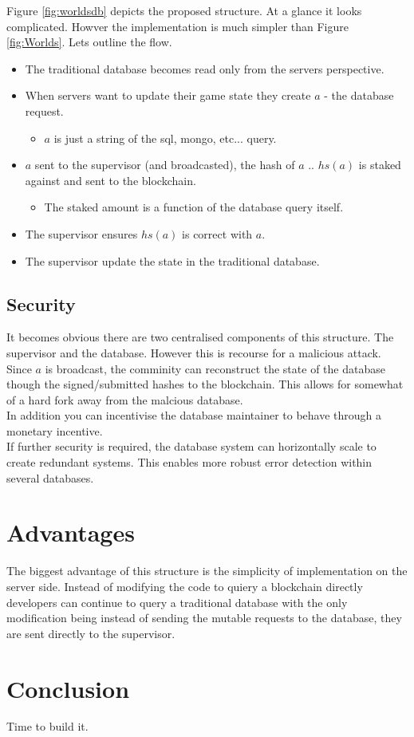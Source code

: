 \documentclass[runningheads,a4paper]{llncs}
\begin{document}
Figure \ref{fig:worldsdb} depicts the proposed structure. At a glance it looks
complicated. Howver the implementation is much simpler than Figure
\ref{fig:Worlds}. Lets outline the flow.

\begin{itemize}
\item The traditional database becomes read only from the servers perspective.
\item When servers want to update their game state they create $a$ - the database request.
\begin{itemize}
\item $a$ is just a string of the sql, mongo, etc... query.
\end{itemize}
\item $a$ sent to the supervisor (and broadcasted), the hash of $a$ .. $hs(a)$ is staked against and sent to the blockchain.
\begin{itemize}
\item The staked amount is a function of the database query itself.
\end{itemize}
\item The supervisor ensures $hs(a)$ is correct with $a$.
\item The supervisor update the state in the traditional database.
\end{itemize}

\subsection{Security}
It becomes obvious there are two centralised components of this structure. The
supervisor and the database. However this is recourse for a malicious attack. 
Since $a$ is broadcast, the comminity can reconstruct the state of the database though the
signed/submitted hashes to the blockchain. This allows for somewhat of a hard
fork away from the malcious database. 
\\

In addition you can incentivise the database maintainer to behave through a
monetary incentive.
\\

If further security is required, the database system can horizontally scale to
create redundant systems. This enables more robust error detection within
several databases.

\section{Advantages}
The biggest advantage of this structure is the simplicity of implementation on the
server side. Instead of modifying the code to quiery a blockchain directly
developers can continue to query a traditional database with the only modification
being instead of sending the mutable requests to the database, they are sent
directly to the supervisor. 

\section{Conclusion}
Time to build it.
\end{document}
